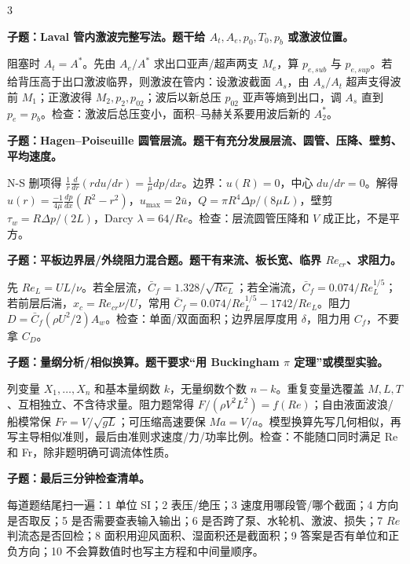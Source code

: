 \documentclass[a4paper]{article}
\newcommand{\qt}[1]{\vspace{0.25pt}\colorbox{Q}{\parbox{\dimexpr\linewidth-2\fboxsep}{\color{white}\bfseries #1}}\par}
\newcommand{\ans}[1]{\colorbox{G}{\parbox{\dimexpr\linewidth-2\fboxsep}{#1}}\par}
\begin{document}
\begin{multicols}{3}
\qt{子题：Laval 管内激波完整写法。题干给 $A_t,A_e,p_0,T_0,p_b$ 或激波位置。}
\ans{阻塞时 $A_t=A^*$。先由 $A_e/A^*$ 求出口亚声/超声两支 $M_e$，算 $p_{e,sub}$ 与 $p_{e,sup}$。若给背压高于出口激波临界，则激波在管内：设激波截面 $A_s$，由 $A_s/A_t$ 超声支得波前 $M_1$；正激波得 $M_2,p_2,p_{02}$；波后以新总压 $p_{02}$ 亚声等熵到出口，调 $A_s$ 直到 $p_e=p_b$。检查：激波后总压变小，面积--马赫关系要用波后新的 $A_2^*$。}
\qt{子题：Hagen--Poiseuille 圆管层流。题干有充分发展层流、圆管、压降、壁剪、平均速度。}
\ans{N-S 删项得 $\frac1r\frac d{dr}(rdu/dr)=\frac1\mu dp/dx$。边界：$u(R)=0$，中心 $du/dr=0$。解得 $u(r)=\frac{-1}{4\mu}\frac{dp}{dx}(R^2-r^2)$，$u_{\max}=2\bar u$，$Q=\pi R^4\Delta p/(8\mu L)$，壁剪 $\tau_w=R\Delta p/(2L)$，Darcy $\lambda=64/Re$。检查：层流圆管压降和 $V$ 成正比，不是平方。}
\qt{子题：平板边界层/外绕阻力混合题。题干有来流、板长宽、临界 $Re_{cr}$、求阻力。}
\ans{先 $Re_L=UL/\nu$。若全层流，$\bar C_f=1.328/\sqrt{Re_L}$；若全湍流，$\bar C_f=0.074/Re_L^{1/5}$；若前层后湍，$x_c=Re_{cr}\nu/U$，常用 $\bar C_f=0.074/Re_L^{1/5}-1742/Re_L$。阻力 $D=\bar C_f(\rho U^2/2)A_w$。检查：单面/双面面积；边界层厚度用 $\delta$，阻力用 $C_f$，不要拿 $C_D$。}
\qt{子题：量纲分析/相似换算。题干要求“用 Buckingham $\pi$ 定理”或模型实验。}
\ans{列变量 $X_1,\dots,X_n$ 和基本量纲数 $k$，无量纲数个数 $n-k$。重复变量选覆盖 $M,L,T$、互相独立、不含待求量。阻力题常得 $F/(\rho V^2L^2)=f(Re)$；自由液面波浪/船模常保 $Fr=V/\sqrt{gL}$；可压缩高速要保 $Ma=V/a$。模型换算先写几何相似，再写主导相似准则，最后由准则求速度/力/功率比例。检查：不能随口同时满足 Re 和 Fr，除非题明确可调流体性质。}
\qt{子题：最后三分钟检查清单。}
\ans{每道题结尾扫一遍：1 单位 SI；2 表压/绝压；3 速度用哪段管/哪个截面；4 方向是否取反；5 是否需要查表输入输出；6 是否跨了泵、水轮机、激波、损失；7 $Re$ 判流态是否回检；8 面积用迎风面积、湿面积还是截面积；9 答案是否有单位和正负方向；10 不会算数值时也写主方程和中间量顺序。}


\end{multicols}
\end{document}
